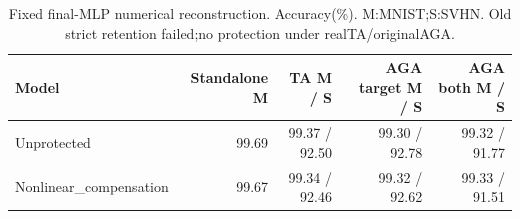 \begin{table}[t]\centering
\caption{Fixed final-MLP numerical reconstruction. Accuracy(\%). M:MNIST;S:SVHN. Old strict retention failed;no protection under realTA/originalAGA.}\label{tab:nonlinear-final-layer}
\begin{tabular}{lrrrr}\toprule
Model & Standalone M & TA M / S & AGA target M / S & AGA both M / S \\
\midrule
Unprotected & 99.69 & 99.37 / 92.50 & 99.30 / 92.78 & 99.32 / 91.77 \\
Nonlinear\_compensation & 99.67 & 99.34 / 92.46 & 99.32 / 92.62 & 99.33 / 91.51 \\
\bottomrule\end{tabular}
\end{table}
